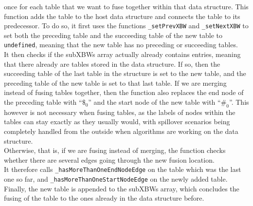 \documentclass[a4paper,12pt,twoside,BCOR=10mm]{scrbook}
\begin{document}
once for each table that we want to fuse together within that data structure.
This function adds the table to the host data structure and connects the table to its predecessor.
To do so, it first uses the functions \texttt{\_setPrevXBW} and \texttt{\_setNextXBW} to
set both the preceding table and the succeeding table
of the new table to \texttt{undefined}, meaning that the new table
has no preceding or succeeding tables. \\
It then checks if the subXBWs array actually already contains entries, meaning that there
already are tables stored in the data structure.
If so, then the succeeding table of the last table in the structure is set to the new table,
and the preceding table of the new table is set to that last table.
If we are merging instead of fusing tables together, then the function also
replaces the end node of the preceding table with “$\$_0$” and the start node
of the new table with “$\#_0$”.
This however is not necessary when fusing tables, as the labels of nodes within the
tables can stay exactly as they usually would, with spillover scenarios being
completely handled from the outside when algorithms are working on the data structure. \\
Otherwise, that is, if we are fusing instead of merging, the function checks
whether there are several edges going through the new fusion location. \\
It therefore calls \texttt{\_hasMoreThanOneEndNodeEdge} on the table which was the last one so far,
and \texttt{\_hasMoreThanOneStartNodeEdge} on the newly added table. \\
Finally, the new table is appended to the subXBWs array, which concludes the fusing of the
table to the ones already in the data structure before.
\end{document}
